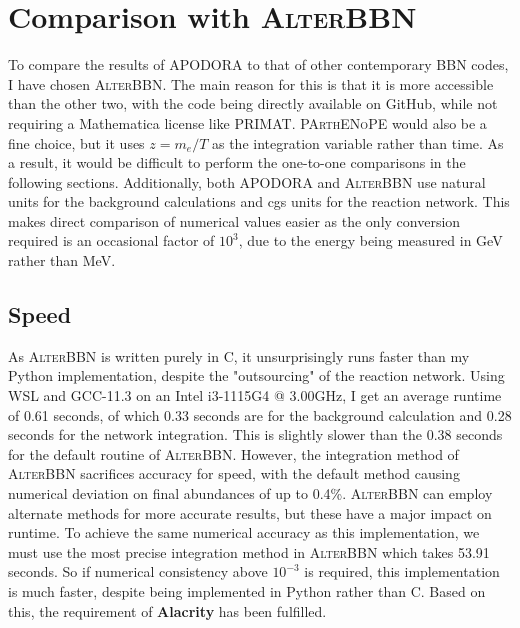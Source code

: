 \section{Comparison with \textsc{AlterBBN}}
\label{sec:Altercompare}
To compare the results of APODORA to that of other contemporary BBN codes, I have chosen \textsc{AlterBBN}. The main reason for this is that it is more accessible than the other two, with the code being directly available on GitHub, while not requiring a Mathematica license like PRIMAT. 
\textsc{PArthENoPE} would also be a fine choice, but it uses $z=m_e/T$ as the integration variable rather than time. As a result, it would be difficult to perform the one-to-one comparisons in the following sections.
Additionally, both APODORA and \textsc{AlterBBN} use natural units for the background calculations and cgs units for the reaction network. This makes direct comparison of numerical values easier as the only conversion required is an occasional factor of $10^3$, due to the energy being measured in GeV rather than MeV. 

\subsection{Speed}
As \textsc{AlterBBN} is written purely in C, it unsurprisingly runs faster than my Python implementation, despite the "outsourcing" of the reaction network. Using WSL and GCC-11.3 on an Intel i3-1115G4 @ 3.00GHz, I get an average runtime of 0.61 seconds, of which 0.33 seconds are for the background calculation and 0.28 seconds for the network integration. This is slightly slower than the 0.38 seconds for the default routine of \textsc{AlterBBN}. However, the integration method of \textsc{AlterBBN} sacrifices accuracy for speed, with the default method causing numerical deviation on final abundances of up to 0.4\%. \textsc{AlterBBN} can employ alternate methods for more accurate results, but these have a major impact on runtime. To achieve the same numerical accuracy as this implementation, we must use the most precise integration method in \textsc{AlterBBN} which takes 53.91 seconds. So if numerical consistency above $10^{-3}$ is required, this implementation is much faster, despite being implemented in Python rather than C.  Based on this, the requirement of \textbf{Alacrity} has been fulfilled.

